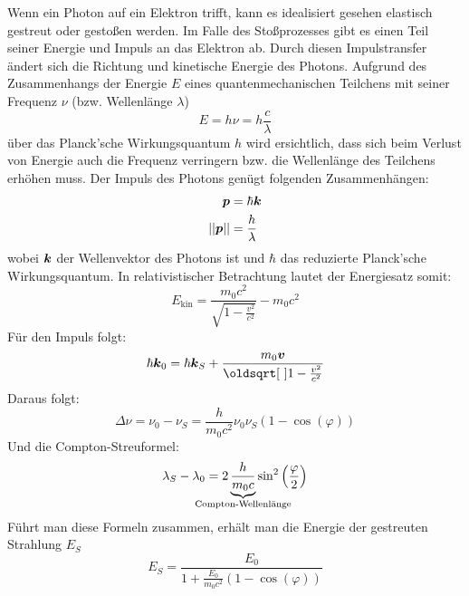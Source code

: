 \documentclass[ngerman]{scrartcl}
\begin{document}
Wenn ein Photon auf ein Elektron trifft, kann es idealisiert gesehen elastisch gestreut oder gestoßen werden. Im Falle des Stoßprozesses gibt es einen Teil seiner Energie und Impuls an das Elektron ab. Durch diesen Impulstransfer ändert sich die Richtung und kinetische Energie des Photons.
Aufgrund des Zusammenhangs der Energie $E$ eines quantenmechanischen Teilchens mit seiner Frequenz $\nu$ (bzw. Wellenlänge $\lambda$)
\begin{equation}
    \label{eq:energie_frequenz_wellenlaenge}
    E = h \nu = h \frac{c}{\lambda}
\end{equation}
über das Planck'sche Wirkungsquantum $h$ wird ersichtlich, dass sich beim Verlust von Energie auch die Frequenz verringern bzw. die Wellenlänge des Teilchens erhöhen muss. Der Impuls des Photons genügt folgenden Zusammenhängen:
\begin{align}
    \vb*{p}     & = \hbar \vb*{k} \label{eq:impuls}            \\
    ||\vb*{p}|| & = \frac{h}{\lambda} \label{eq:impuls_betrag}
\end{align}
wobei $\vb*{k}$ der Wellenvektor des Photons ist und $\hbar$ das reduzierte Planck'sche Wirkungsquantum.
In relativistischer Betrachtung lautet der Energiesatz somit:
\begin{equation}
    \label{eq:energiesatz_relativistisch}
    E_{\text{kin}} = \frac{m_0c^2}{\sqrt{1-\frac{v^2}{c^2}}} - m_0 c^2
\end{equation}
Für den Impuls folgt:
\begin{equation}
    \label{eq:impuls}
    \hbar \vb*{k}_0 = \hbar \vb*{k}_S + \frac{m_0 \vb*{v}}{\sqrt{1-\frac{v^2}{c^2}}}
\end{equation}
Daraus folgt:
\begin{equation}
    \label{eq:Delta_nu}
    \Delta \nu = \nu_0 - \nu_S = \frac{h}{m_0 c^2} \nu_0 \nu_S (1-\cos(\varphi))
\end{equation}
Und die Compton-Streuformel:
\begin{equation}
    \label{eq:}
    \lambda_S - \lambda_0 = 2 \underbrace{\frac{h}{m_0 c}}_{\mathclap{\text{Compton-Wellenlänge}}} \sin^2\left(\frac{\varphi}{2}\right)
\end{equation}
Führt man diese Formeln zusammen, erhält man die Energie der gestreuten Strahlung $E_S$
\begin{equation}
    \label{eq:energie_gestreute_strahlung}
    E_S = \frac{E_0}{1 + \frac{E_0}{m_0 c^2} (1-\cos(\varphi))}
\end{equation}
\end{document}
